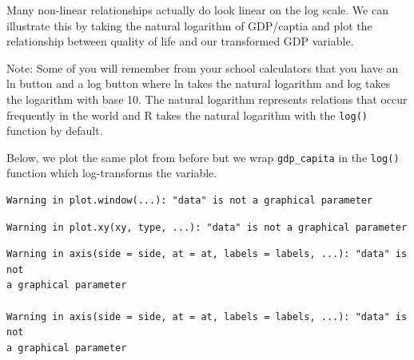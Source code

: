 \documentclass[]{article}
\newenvironment{Shaded}{\begin{snugshade}}{\end{snugshade}}
\newcommand{\DataTypeTok}[1]{\textcolor[rgb]{0.13,0.29,0.53}{#1}}
\newcommand{\DecValTok}[1]{\textcolor[rgb]{0.00,0.00,0.81}{#1}}
\newcommand{\KeywordTok}[1]{\textcolor[rgb]{0.13,0.29,0.53}{\textbf{#1}}}
\newcommand{\NormalTok}[1]{#1}
\newcommand{\OperatorTok}[1]{\textcolor[rgb]{0.81,0.36,0.00}{\textbf{#1}}}
\newcommand{\OtherTok}[1]{\textcolor[rgb]{0.56,0.35,0.01}{#1}}
\newcommand{\StringTok}[1]{\textcolor[rgb]{0.31,0.60,0.02}{#1}}
\begin{document}
Many non-linear relationships actually do look linear on the log scale. We can illustrate this by taking the natural logarithm of GDP/captia and plot the relationship between quality of life and our transformed GDP variable.

Note: Some of you will remember from your school calculators that you have an ln button and a log button where ln takes the natural logarithm and log takes the logarithm with base 10. The natural logarithm represents relations that occur frequently in the world and R takes the natural logarithm with the \texttt{log()} function by default.

Below, we plot the same plot from before but we wrap \texttt{gdp\_capita} in the \texttt{log()} function which log-transforms the variable.

\begin{Shaded}
\end{Shaded}

\begin{verbatim}
Warning in plot.window(...): "data" is not a graphical parameter
\end{verbatim}

\begin{verbatim}
Warning in plot.xy(xy, type, ...): "data" is not a graphical parameter
\end{verbatim}

\begin{verbatim}
Warning in axis(side = side, at = at, labels = labels, ...): "data" is not
a graphical parameter

Warning in axis(side = side, at = at, labels = labels, ...): "data" is not
a graphical parameter
\end{verbatim}
\end{document}

